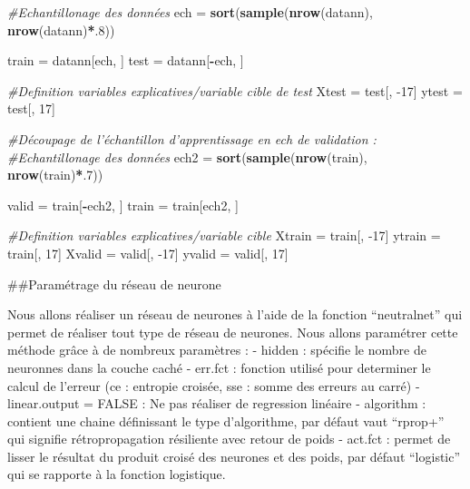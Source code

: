 \documentclass[
]{article}
\newenvironment{Shaded}{\begin{snugshade}}{\end{snugshade}}
\newcommand{\CommentTok}[1]{\textcolor[rgb]{0.56,0.35,0.01}{\textit{#1}}}
\newcommand{\DecValTok}[1]{\textcolor[rgb]{0.00,0.00,0.81}{#1}}
\newcommand{\KeywordTok}[1]{\textcolor[rgb]{0.13,0.29,0.53}{\textbf{#1}}}
\newcommand{\NormalTok}[1]{#1}
\newcommand{\OperatorTok}[1]{\textcolor[rgb]{0.81,0.36,0.00}{\textbf{#1}}}
\newcommand{\StringTok}[1]{\textcolor[rgb]{0.31,0.60,0.02}{#1}}
\begin{document}
\begin{Shaded}
\begin{Highlighting}[]
\CommentTok{#Echantillonage des données}
\NormalTok{ech =}\StringTok{ }\KeywordTok{sort}\NormalTok{(}\KeywordTok{sample}\NormalTok{(}\KeywordTok{nrow}\NormalTok{(datann), }\KeywordTok{nrow}\NormalTok{(datann)}\OperatorTok{*}\NormalTok{.}\DecValTok{8}\NormalTok{))}

\NormalTok{train =}\StringTok{ }\NormalTok{datann[ech, ]}
\NormalTok{test =}\StringTok{ }\NormalTok{datann[}\OperatorTok{-}\NormalTok{ech, ]}

\CommentTok{#Definition variables explicatives/variable cible de test}
\NormalTok{Xtest =}\StringTok{ }\NormalTok{test[, }\DecValTok{-17}\NormalTok{]}
\NormalTok{ytest =}\StringTok{ }\NormalTok{test[, }\DecValTok{17}\NormalTok{]}

\CommentTok{#Découpage de l'échantillon d'apprentissage en ech de validation : }
\CommentTok{#Echantillonage des données}
\NormalTok{ech2 =}\StringTok{ }\KeywordTok{sort}\NormalTok{(}\KeywordTok{sample}\NormalTok{(}\KeywordTok{nrow}\NormalTok{(train), }\KeywordTok{nrow}\NormalTok{(train)}\OperatorTok{*}\NormalTok{.}\DecValTok{7}\NormalTok{))}

\NormalTok{valid =}\StringTok{ }\NormalTok{train[}\OperatorTok{-}\NormalTok{ech2, ]}
\NormalTok{train =}\StringTok{ }\NormalTok{train[ech2, ]}

\CommentTok{#Definition variables explicatives/variable cible }
\NormalTok{Xtrain =}\StringTok{ }\NormalTok{train[, }\DecValTok{-17}\NormalTok{]}
\NormalTok{ytrain =}\StringTok{ }\NormalTok{train[, }\DecValTok{17}\NormalTok{]}
\NormalTok{Xvalid =}\StringTok{ }\NormalTok{valid[, }\DecValTok{-17}\NormalTok{]}
\NormalTok{yvalid =}\StringTok{ }\NormalTok{valid[, }\DecValTok{17}\NormalTok{]}
\end{Highlighting}
\end{Shaded}

\#\#Paramétrage du réseau de neurone

Nous allons réaliser un réseau de neurones à l'aide de la fonction
``neutralnet'' qui permet de réaliser tout type de réseau de neurones.
Nous allons paramétrer cette méthode grâce à de nombreux paramètres : -
hidden : spécifie le nombre de neuronnes dans la couche caché - err.fct
: fonction utilisé pour determiner le calcul de l'erreur (ce : entropie
croisée, sse : somme des erreurs au carré) - linear.output = FALSE : Ne
pas réaliser de regression linéaire - algorithm : contient une chaine
définissant le type d'algorithme, par défaut vaut ``rprop+'' qui
signifie rétropropagation résiliente avec retour de poids - act.fct :
permet de lisser le résultat du produit croisé des neurones et des
poids, par défaut ``logistic'' qui se rapporte à la fonction logistique.
\end{document}
